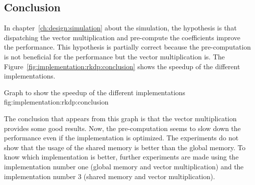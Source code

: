 \subsection{Conclusion}
\label{ch:implementation:rkdp:conclusion}

In chapter~\ref{ch:design:simulation} about the simulation, the hypothesis is
that dispatching the vector multiplication and pre-compute the coefficients
improve the performance.
This hypothesis is partially correct because the pre-computation is not
beneficial for the performance but the vector multiplication is.
The Figure~\ref{fig:implementation:rkdp:conclusion} shows the speedup of the
different implementations.

{Graph to show the speedup of the different implementations}
{fig:implementation:rkdp:conclusion}

The conclusion that appears from this graph is that the vector multiplication
provides some good results.
Now, the pre-computation seems to slow down the performance even if the
implementation is optimized.
The experiments do not show that the usage of the shared memory is better than
the global memory.
To know which implementation is better, further experiments are made using the
implementation number one (global memory and vector multiplication) and the
implementation number 3 (shared memory and vector multiplication).
